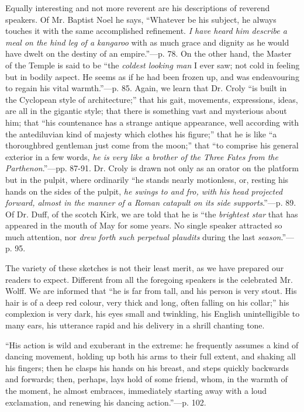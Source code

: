 Equally
interesting and not more reverent are his descriptions of reverend
speakers. Of Mr. Baptist Noel he says, ``Whatever be his subject, he
always touches it with the same accomplished refinement. \emph{I have heard
him describe a meal on the hind leg of a kangaroo} with as much grace
and dignity as he would have dwelt on the destiny of an empire.''—p.
78. On the other hand, the Master of the Temple is said to be ``the \emph{coldest
looking man} I ever saw; not cold in feeling but in bodily aspect. He
seems as if he had been frozen up, and was endeavouring to regain his
vital
warmth.''—p. 85. Again, we learn that Dr. Croly ``is built in the
Cyclopean style of architecture;'' that his gait, movements,
expressions, ideas, are all in the gigantic style; that there is
something vast and mysterious about him; that ``his countenance has a
strange antique appearance, well according with the antediluvian kind of
majesty which clothes his figure;'' that he is like ``a thoroughbred
gentleman just come from the moon;'' that ``to comprise his general
exterior in a few words, \emph{he is very like a brother of the Three Fates
from the Parthenon}.''—pp. 87-91. Dr. Croly is drawn not only as
an orator on the platform but in the pulpit, where ordinarily ``he
stands nearly motionless, or, resting his hands on the sides of the
pulpit, \emph{he swings to and fro, with his head projected forward, almost
in the manner of a Roman catapult on its side supports}.''—p. 89.
Of Dr. Duff, of the scotch Kirk, we are told that he is ``the \emph{brightest
star} that has appeared in the mouth of May for some years. No single
speaker attracted so much attention, nor \emph{drew forth such perpetual
plaudits} during the last \emph{season}.''—p. 95.

The variety
of these sketches is not their least merit, as we have prepared our
readers to expect. Different from all the foregoing speakers is the
celebrated Mr. Wolff. We are informed that ``he is far from tall, and
his person is very stout. His hair is of a deep red colour, very thick
and long, often falling on his collar;'' his complexion is very dark,
his eyes small and twinkling, his English unintelligible to many ears,
his utterance rapid and his delivery in a shrill chanting tone.

``His
action is wild and exuberant in the extreme: he frequently assumes a
kind of dancing movement, holding up both his arms to their full extent,
and shaking all his fingers; then he clasps his hands on his breast, and
steps quickly backwards and forwards; then, perhaps, lays hold of some
friend, whom, in the warmth of the moment, he almost embraces,
immediately starting away with a loud exclamation, and renewing his
dancing action.''—p. 102.

